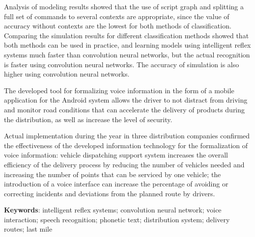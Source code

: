 Analysis of modeling results showed that the use of script graph and splitting a full set of commands to several contexts are appropriate, since the value of accuracy without contexts are the lowest for both methods of classification. Comparing the simulation results for different classification methods showed that both methods can be used in practice, and learning models using intelligent reflex systems much faster than convolution neural networks, but the actual recognition is faster using convolution neural networks. The accuracy of simulation is also higher using convolution neural networks.

The developed tool for formalizing voice information in the form of a mobile application for the Android system allows the driver to not distract from driving and monitor road conditions that can accelerate the delivery of products during the distribution, as well as increase the level of security.

Actual implementation during the year in three distribution companies confirmed the effectiveness of the developed information technology for the formalization of voice information: vehicle dispatching support system increases the overall efficiency of the delivery process by reducing the number of vehicles needed and increasing the number of points that can be serviced by one vehicle; the introduction of a voice interface can increase the percentage of avoiding or correcting incidents and deviations from the planned route by drivers.

\textbf{Keywords}: intelligent reflex systems; convolution neural network; voice interaction; speech recognition; phonetic text; distribution system; delivery routes; last mile

